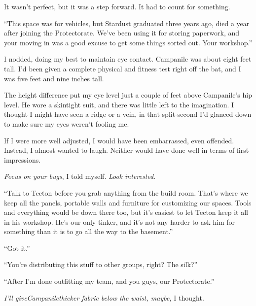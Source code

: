 It wasn't perfect, but it was a step forward.  It had to count for something.



\blacksquare



``This space was for vehicles, but Stardust graduated three years ago, died a year after joining the Protectorate.  We've been using it for storing paperwork, and your moving in was a good excuse to get some things sorted out.  Your workshop.''



I nodded, doing my best to maintain eye contact.  Campanile was about eight feet tall.  I'd been given a complete physical and fitness test right off the bat, and I was five feet and nine inches tall.



The height difference put my eye level just a couple of feet above Campanile's hip level.  He wore a skintight suit, and there was little left to the imagination.  I thought I might have seen a ridge or a vein, in that split-second I'd glanced down to make sure my eyes weren't fooling me.



If I were more well adjusted, I would have been embarrassed, even offended.  Instead, I almost wanted to laugh.  Neither would have done well in terms of first impressions.



\emph{Focus on your bugs}, I told myself.  \emph{Look interested}.



``Talk to Tecton before you grab anything from the build room.  That's where we keep all the panels, portable walls and furniture for customizing our spaces.  Tools and everything would be down there too, but it's easiest to let Tecton keep it all in his workshop.  He's our only tinker, and it's not any harder to ask him for something than it is to go all the way to the basement.''



``Got it.''



``You're distributing this stuff to other groups, right?  The silk?''



``After I'm done outfitting my team, and you guys, our Protectorate.''



\emph{I'll give}\emph{Campanile}\emph{thicker fabric below the waist, maybe, }I thought.



